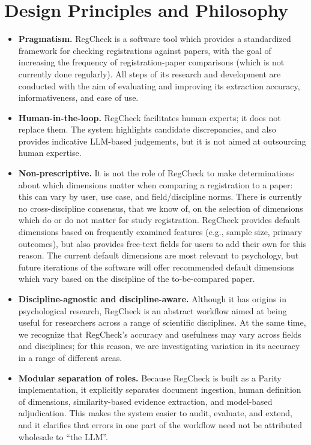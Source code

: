 \documentclass{article}
\begin{document}
\section{Design Principles and Philosophy}
\begin{itemize}
\item \textbf{Pragmatism.} RegCheck is a software tool which provides a standardized framework for checking registrations against papers, with the goal of increasing the frequency of registration-paper comparisons (which is not currently done regularly). All steps of its research and development are conducted with the aim of evaluating and improving its extraction accuracy, informativeness, and ease of use.
\item \textbf{Human-in-the-loop.} RegCheck facilitates human experts; it does not replace them. The system highlights candidate discrepancies, and also provides indicative LLM-based judgements, but it is not aimed at outsourcing human expertise.
\item \textbf{Non-prescriptive.} It is not the role of RegCheck to make determinations about which dimensions matter when comparing a registration to a paper: this can vary by user, use case, and field/discipline norms. There is currently no cross-discipline consensus, that we know of, on the selection of dimensions which do or do not matter for study registration. RegCheck provides default dimensions based on frequently examined features (e.g., sample size, primary outcomes), but also provides free-text fields for users to add their own for this reason. The current default dimensions are most relevant to psychology, but future iterations of the software will offer recommended default dimensions which vary based on the discipline of the to-be-compared paper.
\item \textbf{Discipline-agnostic and discipline-aware.} Although it has origins in psychological research, RegCheck is an abstract workflow aimed at being useful for researchers across a range of scientific disciplines. At the same time, we recognize that RegCheck's accuracy and usefulness may vary across fields and disciplines; for this reason, we are investigating variation in its accuracy in a range of different areas.
\item \textbf{Modular separation of roles.} Because RegCheck is built as a Parity implementation, it explicitly separates document ingestion, human definition of dimensions, similarity-based evidence extraction, and model-based adjudication. This makes the system easier to audit, evaluate, and extend, and it clarifies that errors in one part of the workflow need not be attributed wholesale to ``the LLM''.
\end{itemize}
\end{document}
